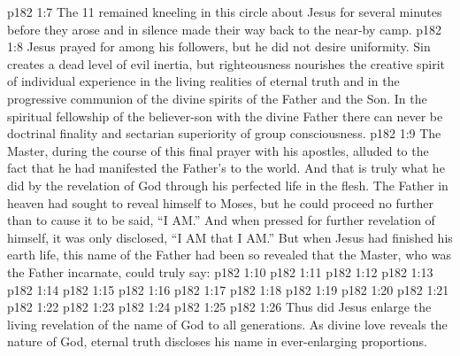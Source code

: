 \vs p182 1:7 The 11 remained kneeling in this circle about Jesus for several minutes before they arose and in silence made their way back to the near\hyp{}by camp.
\vs p182 1:8 \pc Jesus prayed for  among his followers, but he did not desire uniformity. Sin creates a dead level of evil inertia, but righteousness nourishes the creative spirit of individual experience in the living realities of eternal truth and in the progressive communion of the divine spirits of the Father and the Son. In the spiritual fellowship of the believer\hyp{}son with the divine Father there can never be doctrinal finality and sectarian superiority of group consciousness.
\vs p182 1:9 The Master, during the course of this final prayer with his apostles, alluded to the fact that he had manifested the Father’s  to the world. And that is truly what he did by the revelation of God through his perfected life in the flesh. The Father in heaven had sought to reveal himself to Moses, but he could proceed no further than to cause it to be said, “I AM.” And when pressed for further revelation of himself, it was only disclosed, “I AM that I AM.” But when Jesus had finished his earth life, this name of the Father had been so revealed that the Master, who was the Father incarnate, could truly say:
\vs p182 1:10 
\vs p182 1:11 
\vs p182 1:12 
\vs p182 1:13 
\vs p182 1:14 
\vs p182 1:15 
\vs p182 1:16 
\vs p182 1:17 
\vs p182 1:18 
\vs p182 1:19 
\vs p182 1:20 
\vs p182 1:21 
\vs p182 1:22 
\vs p182 1:23 
\vs p182 1:24 
\vs p182 1:25 
\vs p182 1:26 \pc Thus did Jesus enlarge the living revelation of the name of God to all generations. As divine love reveals the nature of God, eternal truth discloses his name in ever\hyp{}enlarging proportions.
